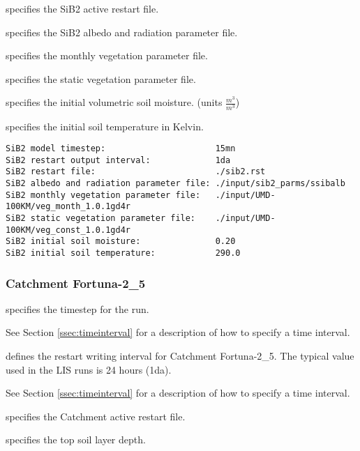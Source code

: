   specifies the SiB2 active restart file.

  specifies the
 SiB2 albedo and radiation parameter file.

  specifies the
 monthly vegetation parameter file.

  specifies the
 static vegetation parameter file.

  specifies the
 initial volumetric soil moisture. (units $\frac{m^3}{m^3}$)

  specifies the
 initial soil temperature in Kelvin.
 

 \begin{Verbatim}[frame=single]
SiB2 model timestep:                      15mn
SiB2 restart output interval:             1da
SiB2 restart file:                        ./sib2.rst
SiB2 albedo and radiation parameter file: ./input/sib2_parms/ssibalb
SiB2 monthly vegetation parameter file:   ./input/UMD-100KM/veg_month_1.0.1gd4r
SiB2 static vegetation parameter file:    ./input/UMD-100KM/veg_const_1.0.1gd4r
SiB2 initial soil moisture:               0.20
SiB2 initial soil temperature:            290.0
 \end{Verbatim}
 

 
 \subsubsection{Catchment Fortuna-2\_5} \label{sssec:lsm_clsmf25}
 

 
  specifies the timestep for the run.

 See Section \ref{ssec:timeinterval} for a description
 of how to specify a time interval.

  defines the restart
 writing  interval for Catchment Fortuna-2\_5. The typical
 value used in the LIS runs is 24 hours (1da).

 See Section \ref{ssec:timeinterval} for a description
 of how to specify a time interval.

  specifies the Catchment active
 restart file.

  specifies the top soil
 layer depth.

